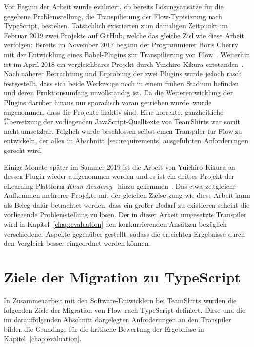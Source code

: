 Vor Beginn der Arbeit wurde evaluiert, ob bereits Lösungsansätze für die gegebene Problemstellung, die Transpilierung der Flow-Typisierung nach TypeScript, bestehen. Tatsächlich existierten zum damaligen Zeitpunkt im Februar 2019 zwei Projekte auf GitHub, welche das gleiche Ziel wie diese Arbeit verfolgen: Bereits im November 2017 begann der Programmierer Boris Cherny mit der Entwicklung eines Babel-Plugins zur Transpilierung von Flow~\autocite{CHERNY:FLOW_TO_TS}. Weiterhin ist im April 2018 ein vergleichbares Projekt durch Yuichiro Kikura entstanden~\autocite{KIKURA:FLOW_TO_TS}. Nach näherer Betrachtung und Erprobung der zwei Plugins wurde jedoch rasch festgestellt, dass sich beide Werkzeuge noch in einem frühen Stadium befinden und deren Funktionsumfang unvollständig ist. Da die Weiterentwicklung der Plugins darüber hinaus nur sporadisch voran getrieben wurde, wurde angenommen, dass die Projekte inaktiv sind. Eine korrekte, ganzheitliche Übersetzung der vorliegenden JavaScript-Quelltexte von TeamShirts war somit nicht umsetzbar. Folglich wurde beschlossen selbst einen Transpiler für Flow zu entwickeln, der allen in Abschnitt~\ref{sec:requirements} ausgeführten Anforderungen gerecht wird.

Einige Monate später im Sommer 2019 ist die Arbeit von Yuichiro Kikura an dessen Plugin wieder aufgenommen worden und es ist ein drittes Projekt der eLearning-Plattform \textit{Khan Academy}~\autocite{KHAN_ACADEMY} hinzu gekommen~\autocite{KHAN:FLOW_TO_TS}. Das etwa zeitgleiche Aufkommen mehrerer Projekte mit der gleichen Zielsetzung wie diese Arbeit kann als Beleg dafür betrachtet werden, dass ein großer Bedarf zu existieren scheint die vorliegende Problemstellung zu lösen.
Der in dieser Arbeit umgesetzte Transpiler wird in Kapitel~\ref{chap:evaluation} den konkurrierenden Ansätzen bezüglich verschiedener Aspekte gegenüber gestellt, sodass die erreichten Ergebnisse durch den Vergleich besser eingeordnet werden können.

\section{Ziele der Migration zu TypeScript}
\label{sec:goals}

In Zusammenarbeit mit den Software-Entwicklern bei TeamShirts wurden die folgenden Ziele der Migration von Flow nach TypeScript definiert. Diese und die im darauffolgenden Abschnitt dargelegten Anforderungen an den Transpiler bilden die Grundlage für die kritische Bewertung der Ergebnisse in Kapitel~\ref{chap:evaluation}.

